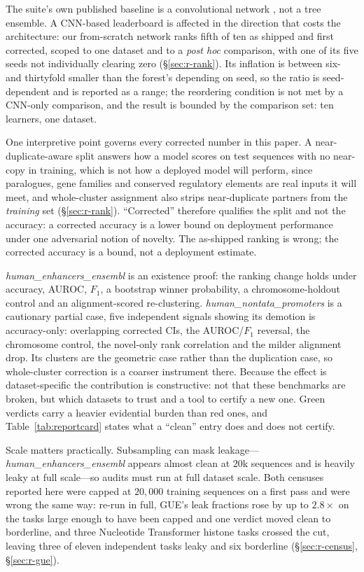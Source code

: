 \documentclass[webpdf,modern,large,namedate]{oup-authoring-template}%
\begin{document}
The suite's own published baseline is a convolutional network \citep{gresova2023}, not a tree ensemble. A CNN-based leaderboard is affected in the direction that costs the architecture: our from-scratch network ranks fifth of ten as shipped and first corrected, scoped to one dataset and to a \emph{post hoc} comparison, with one of its five seeds not individually clearing zero (\S\ref{sec:r-rank}). Its inflation is between six- and thirtyfold smaller than the forest's depending on seed, so the ratio is seed-dependent and is reported as a range; the reordering condition is not met by a CNN-only comparison, and the result is bounded by the comparison set: ten learners, one dataset.

One interpretive point governs every corrected number in this paper. A near-duplicate-aware split answers how a model scores on test sequences with no near-copy in training, which is not how a deployed model will perform, since paralogues, gene families and conserved regulatory elements are real inputs it will meet, and whole-cluster assignment also strips near-duplicate partners from the \emph{training} set (\S\ref{sec:r-rank}). ``Corrected'' therefore qualifies the split and not the accuracy: a corrected accuracy is a lower bound on deployment performance under one adversarial notion of novelty. The as-shipped ranking is wrong; the corrected accuracy is a bound, not a deployment estimate.

\textit{human\_enhancers\_ensembl} is an existence proof: the ranking change holds under accuracy, AUROC, $F_1$, a bootstrap winner probability, a chromosome-holdout control and an alignment-scored re-clustering. \textit{human\_nontata\_promoters} is a cautionary partial case, five independent signals showing its demotion is accuracy-only: overlapping corrected CIs, the AUROC/$F_1$ reversal, the chromosome control, the novel-only rank correlation and the milder alignment drop. Its clusters are the geometric case rather than the duplication case, so whole-cluster correction is a coarser instrument there. Because the effect is dataset-specific the contribution is constructive: not that these benchmarks are broken, but which datasets to trust and a tool to certify a new one. Green verdicts carry a heavier evidential burden than red ones, and Table~\ref{tab:reportcard} states what a ``clean'' entry does and does not certify.

Scale matters practically. Subsampling can mask leakage---\textit{human\_enhancers\_ensembl} appears almost clean at $20$k sequences and is heavily leaky at full scale---so audits must run at full dataset scale. Both censuses reported here were capped at $20{,}000$ training sequences on a first pass and were wrong the same way: re-run in full, GUE's leak fractions rose by up to $2.8\times$ on the tasks large enough to have been capped and one verdict moved clean to borderline, and three Nucleotide Transformer histone tasks crossed the cut, leaving three of eleven independent tasks leaky and six borderline (\S\ref{sec:r-census}, \S\ref{sec:r-gue}).
\end{document}
